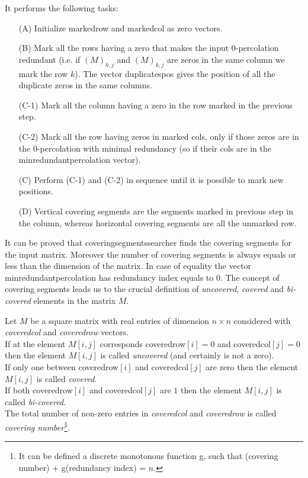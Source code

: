 \documentclass[12pt]{ClasseMatematicamente}
\begin{document}
\noindent
It performs the following tasks:
\begin{enumerate}
 \item[(A)] Initialize marked\textunderscore row and marked\textunderscore col as zero vectors.
 \item[(B)] Mark all the rows having a zero that makes the input $0$-percolation redundant (i.e. if $(M)_{h,j}$ and $(M)_{k,j}$ are zeros in the same column we mark the row $k$). The vector duplicates\textunderscore pos gives the position of all the duplicate zeros in the same columns.
 \item[(C-1)] Mark all the column having a zero in the row marked in the previous step.
 \item[(C-2)] Mark all the row having zeros in marked cols, only if those zeros are in the $0$-percolation with minimal redundancy (so if their cols are in the min\textunderscore redundant\textunderscore percolation vector).
 \item[(C)] Perform (C-1) and (C-2) in sequence until it is possible to mark new positions.
 \item[(D)] Vertical covering segments are the segments marked in previous step in the column, whereas horizontal covering segments are all the unmarked row.
\end{enumerate}
It can be proved that covering\textunderscore segments\textunderscore searcher finds the covering segments for the input matrix. Moreover the number of covering segments is always equals or less than the dimension of the matrix. In case of equality the vector min\textunderscore redundant\textunderscore percolation has redundancy index equals to $0$.
The concept of covering segments leads us to the crucial definition of \emph{uncovered}, \emph{covered} and \emph{bi-covered} elements in the matrix $M$. 
\begin{definition}
 Let $M$ be a square matrix with real entries of dimension $n\times n$ considered with \emph{covered\textunderscore col} and \emph{covered\textunderscore row} vectors. \\
 If at the element $M[i,j]$ corresponds covered\textunderscore row$[i] = 0 $ and covered\textunderscore col$[j] = 0$ then the element $M[i,j]$ is called \emph{uncovered} (and certainly is not a zero). \\
 If only one between covered\textunderscore row$[i]$ and covered\textunderscore col$[j]$ are zero then the element $M[i,j]$ is called \emph{covered}. \\
 If both covered\textunderscore row$[i]$ and covered\textunderscore col$[j]$ are $1$ then the element $M[i,j]$ is called \emph{bi-covered}.\\
 The total number of non-zero entries in \emph{covered\textunderscore col} and \emph{covered\textunderscore row} is called \emph{covering number}\footnote{It can be defined a discrete monotonous function g, such that (covering number) + g(redundancy index) = $n$.}.
\end{definition}
\end{document}
